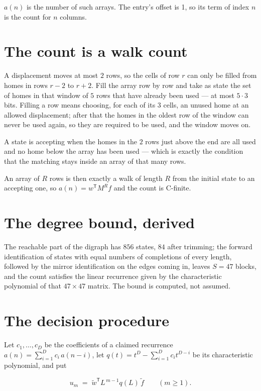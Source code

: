 \documentclass[11pt]{article}
\theoremstyle{definition}
\begin{document}
$a(n)$ is the number of such arrays. The entry's offset is 1, so its term of index $n$ is the count for $n$ columns.

\section{The count is a walk count}

A displacement moves at most $2$ rows, so the cells of row $r$ can only be filled from homes in rows $r-2$ to $r+2$. Fill the array row by row and take as state the set of homes in that window of $5$ rows that have already been used --- at most $5\cdot3$ bits. Filling a row means choosing, for each of its $3$ cells, an unused home at an allowed displacement; after that the homes in the oldest row of the window can never be used again, so they are required to be used, and the window moves on.

A state is accepting when the homes in the $2$ rows just above the end are all used and no home below the array has been used --- which is exactly the condition that the matching stays inside an array of that many rows.

An array of $R$ rows is then exactly a walk of length $R$ from the initial state to an accepting one, so $a(n) = w^{\mathsf T}M^{R}f$ and the count is C-finite.

\section{The degree bound, derived}

The reachable part of the digraph has $856$ states, $84$ after trimming; the forward identification of states with equal numbers of completions of every length, followed by the mirror identification on the edges coming in, leaves $S = 47$ blocks, and the count satisfies the linear recurrence given by the characteristic polynomial of that $47\times47$ matrix. The bound is computed, not assumed.

\section{The decision procedure}

Let $c_1,\dots,c_D$ be the coefficients of a claimed recurrence $a(n) = \sum_{i=1}^{D} c_i\,a(n-i)$, let $q(t) = t^{D} - \sum_{i=1}^{D} c_i t^{D-i}$ be its characteristic polynomial, and put

\[u_m \;=\; \tilde w^{\mathsf T} L^{\,m-1} q(L)\,\tilde f \qquad (m \ge 1).\]
\end{document}
